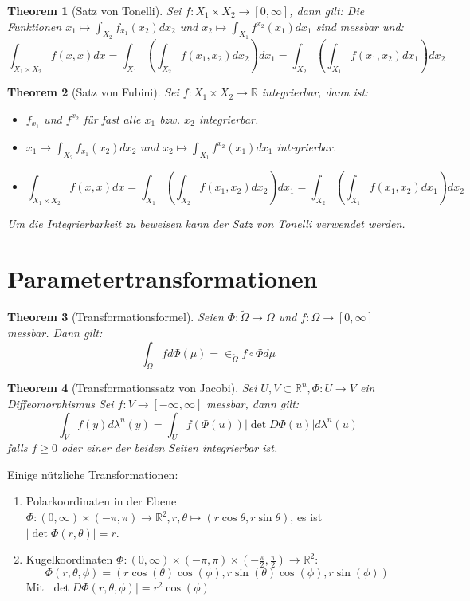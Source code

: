 \documentclass[10pt,a4paper]{article}
\newtheorem{theorem}{Theorem}
\begin{document}
\begin{theorem}[Satz von Tonelli]
	Sei $f: X_1 \times X_2 \to [0, \infty]$, dann gilt:
	Die Funktionen $x_1 \mapsto \int_{X_2} f_{x_1}(x_2)dx_2$ und $x_2 \mapsto \int_{X_1}f^{x_2}(x_1) dx_1$ sind messbar und:
	$$\int_{X_1\times X_2}f(x, x)dx = \int_{X_1}(\int_{X_2}f(x_1, x_2) dx_2)dx_1 =  \int_{X_2}(\int_{X_1}f(x_1, x_2) dx_1)dx_2$$
\end{theorem}
\begin{theorem}[Satz von Fubini]
	Sei $f: X_1 \times X_2 \to \mathbb{R}$ integrierbar, dann ist: 
	\begin{itemize}
		\item $f_{x_1}$ und $f^{x_2}$ für fast alle $x_1$ bzw. $x_2$ integrierbar.
		\item  $x_1 \mapsto \int_{X_2} f_{x_1}(x_2)dx_2$ und $x_2 \mapsto \int_{X_1}f^{x_2}(x_1) dx_1$ integrierbar.
		\item 	$$\int_{X_1\times X_2}f(x, x)dx = \int_{X_1}(\int_{X_2}f(x_1, x_2) dx_2)dx_1 =  \int_{X_2}(\int_{X_1}f(x_1, x_2) dx_1)dx_2$$
	\end{itemize}
	Um die Integrierbarkeit zu beweisen kann der Satz von Tonelli verwendet werden.
\end{theorem}
\section{Parametertransformationen}
\begin{theorem}[Transformationsformel]
	Seien $\Phi: \tilde{\Omega} \to \Omega$  und $f:\Omega \to [0, \infty]$ messbar. Dann gilt:
	$$\int_\Omega fd\Phi(\mu) = \in_{\tilde{\Omega}}f\circ \Phi d\mu$$
\end{theorem}
\begin{theorem}[Transformationssatz von Jacobi]
	Sei $U, V \subset \mathbb{R}^n, \Phi: U\to V$ ein Diffeomorphismus Sei $f: V\to [-\infty, \infty]$ messbar, dann gilt:
	$$\int_V f(y)d\lambda^n(y) = \int_Uf(\Phi(u))|\det D\Phi(u)| d\lambda^n(u)$$
	falls $f \geq 0$ oder einer der beiden Seiten integrierbar ist.
\end{theorem}
Einige nützliche Transformationen:
\begin{enumerate}
	\item Polarkoordinaten in der Ebene $\Phi: (0, \infty)\times(-\pi, \pi) \to \mathbb{R}^2, r, \theta \mapsto (r \cos \theta, r\sin \theta)$, es ist $|\det \Phi(r, \theta)| = r$.
	\item Kugelkoordinaten $\Phi: (0, \infty)\times(-\pi, \pi) \times (-\frac{\pi}{2}, \frac{\pi}{2})\to \mathbb{R}^2$:
	$$\Phi(r, \theta, \phi) = (r\cos(\theta)\cos(\phi), r\sin(\theta)\cos(\phi), r \sin(\phi))$$
	Mit $|\det D\Phi(r, \theta, \phi)| = r^2 \cos(\phi)$
\end{enumerate}
\end{document}
